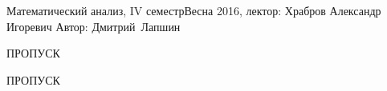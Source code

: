 


\BigHeader
    {Математический анализ, IV семестр}{Весна 2016, лектор: Храбров Александр Игоревич}
    {Автор: Дмитрий~Лапшин}
\gdef\LectureName{Мат. анализ, IV семестр}











\begin{center}ПРОПУСК\end{center}



\begin{center}ПРОПУСК\end{center}



